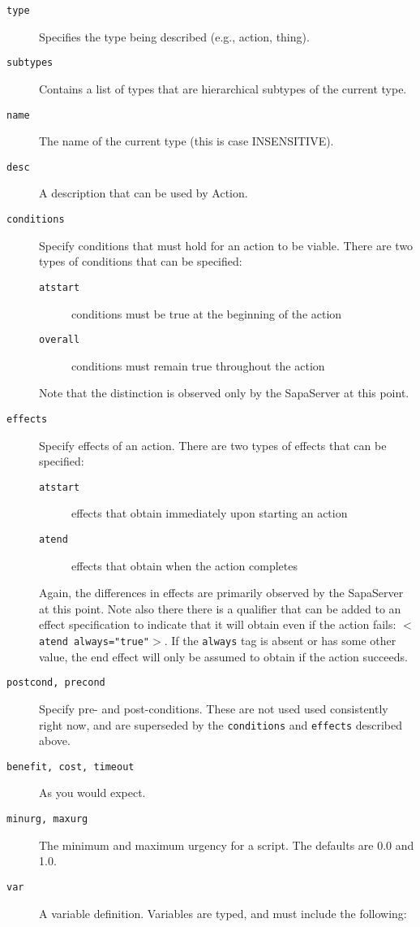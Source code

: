 \documentclass[11pt,letterpaper]{article}
\begin{document}
\begin{description}
\item[\tt type] Specifies the type being described (e.g., action, 
thing).
\item[\tt subtypes] Contains a list of types that are hierarchical 
subtypes of the current type.
\item[\tt name] The name of the current type (this is case 
INSENSITIVE).
\item[\tt desc] A description that can be used by Action.
\item[\tt conditions] Specify conditions that must hold for an action
  to be viable.  There are two types of conditions that can be
  specified:
  \begin{description}
    \item[\tt atstart] conditions must be true at the beginning of the
      action
    \item[\tt overall] conditions must remain true throughout the
      action
  \end{description}
  \noindent Note that the distinction is observed only by the SapaServer at this
  point.
\item[\tt effects] Specify effects of an action.  There are two types
  of effects that can be specified:
  \begin{description}
    \item[\tt atstart] effects that obtain immediately upon starting
      an action
    \item[\tt atend] effects that obtain when the action completes
  \end{description}
  \noindent Again, the differences in effects are primarily observed by the
  SapaServer at this point.  Note also there there is a qualifier
  that can be added to an effect specification to indicate that it
  will obtain even if the action fails: $<${\tt atend
    always="true"}$>$.  If the {\tt always} tag is absent or has some
    other value, the end effect will only be assumed to obtain if the
    action succeeds.
\item[\tt postcond, precond] Specify pre- and post-conditions.  These 
are not used used consistently right now, and are superseded
by the {\tt conditions} and {\tt effects} described above.
\item[\tt benefit, cost, timeout] As you would expect.
\item[\tt minurg, maxurg] The minimum and maximum urgency for a 
script.  The defaults are 0.0 and 1.0.
\item[\tt var] A variable definition.  Variables are typed, and must 
include the following:


\end{description}
\end{document}
